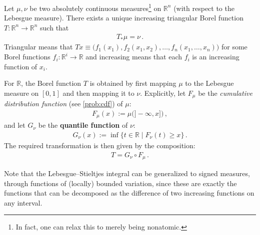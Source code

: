     \begin{property}
        Let $\mu,\nu$ be two absolutely continuous measures\footnote{In fact, one can relax this to merely being nonatomic.} on $\mathbb{R}^n$ (with respect to the Lebesgue measure). There exists a unique increasing triangular Borel function $T:\mathbb{R}^n\rightarrow\mathbb{R}^n$ such that
        \begin{gather}
            T_\ast\mu = \nu\,.
        \end{gather}
        Triangular means that $Tx\equiv\bigl(f_1(x_1),f_2(x_1,x_2),\ldots,f_n(x_1,\ldots,x_n)\bigr)$ for some Borel functions $f_i:\mathbb{R}^i\rightarrow\mathbb{R}$ and increasing means that each $f_i$ is an increasing function of $x_i$.
    \end{property}
    \begin{remark}
        For $\mathbb{R}$, the Borel function $T$ is obtained by first mapping $\mu$ to the Lebesgue measure on $[0,1]$ and then mapping it to $\nu$. Explicitly, let $F_\mu$ be the \textit{cumulative distribution function} (see \cref{prob:cdf}) of $\mu$:
        \begin{gather}
            F_\mu(x) := \mu\bigl(]-\infty,x]\bigr)\,,
        \end{gather}
        and let $G_\nu$ be the \textbf{quantile function} of $\nu$:
        \begin{gather}
            G_\nu(x) := \inf\{t\in\mathbb{R}\mid F_\nu(t)\geq x\}\,.
        \end{gather}
        The required transformation is then given by the composition:
        \begin{gather}
            T = G_\nu\circ F_\mu\,.
        \end{gather}
    \end{remark}

    \begin{remark}\label{measure:bounded_variation_integral}
        Note that the Lebesgue--Stieltjes integral can be generalized to signed measures, through functions of (locally) bounded variation, since these are exactly the functions that can be decomposed as the difference of two increasing functions on any interval.
    \end{remark}
    
